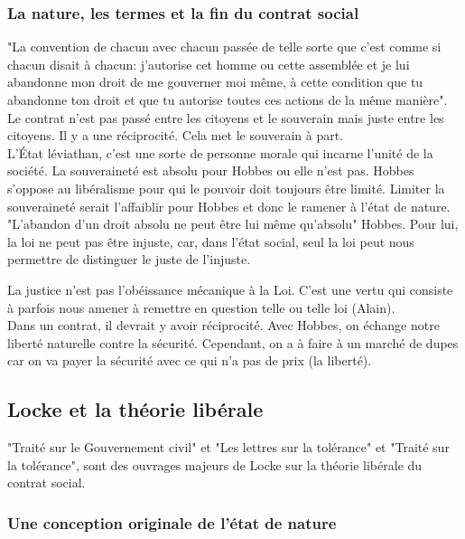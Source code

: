 \documentclass[10pt, a4paper, openany]{book}
\begin{document}
\subsubsection{La nature, les termes et la fin du contrat social}

"La convention de chacun avec chacun passée de telle sorte que c'est comme si chacun disait à chacun: j'autorise cet homme ou cette assemblée et je lui abandonne mon droit de me gouverner moi même, à cette condition que tu abandonne ton droit et que tu autorise toutes ces actions de la même manière". Le contrat n'est pas passé entre les citoyens et le souverain mais juste entre les citoyens. Il y a une réciprocité. Cela met le souverain à part. \\
L'État léviathan, c'est une sorte de personne morale qui incarne l'unité de la société. La souveraineté est absolu pour Hobbes ou elle n'est pas. Hobbes s'oppose au libéralisme pour qui le pouvoir doit toujours être limité. Limiter la souveraineté serait l'affaiblir pour Hobbes et donc le ramener à l'état de nature. \\
"L'abandon d'un droit absolu ne peut être lui même qu'absolu" Hobbes. Pour lui, la loi ne peut pas être injuste, car, dans l'état social, seul la loi peut nous permettre de distinguer le juste de l'injuste. 


La justice n'est pas l'obéissance mécanique à la Loi. C'est une vertu qui consiste à parfois nous amener à remettre en question telle ou telle loi (Alain). \\
Dans un contrat, il devrait y avoir réciprocité. Avec Hobbes, on échange notre liberté naturelle contre la sécurité. Cependant, on a à faire à un marché de dupes car on va payer la sécurité avec ce qui n'a pas de prix (la liberté). 

\subsection{Locke et la théorie libérale}

"Traité sur le Gouvernement civil" et "Les lettres sur la tolérance" et "Traité sur la tolérance", sont des ouvrages majeurs de Locke sur la théorie libérale du contrat social. 

\subsubsection{Une conception originale de l'état de nature}
\end{document}
